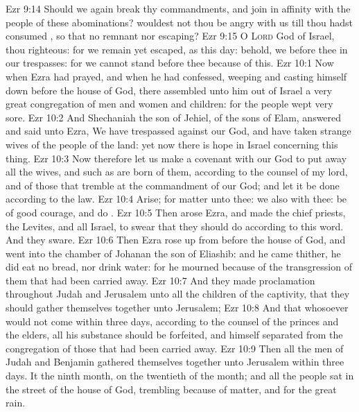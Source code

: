\vs Ezr 9:14 Should we again break thy commandments, and join in affinity with the people of these abominations? wouldest not thou be angry with us till thou hadst consumed , so that  no remnant nor escaping?
\vs Ezr 9:15 O \textsc{Lord} God of Israel, thou  righteous: for we remain yet escaped, as  this day: behold, we  before thee in our trespasses: for we cannot stand before thee because of this.
\vs Ezr 10:1 Now when Ezra had prayed, and when he had confessed, weeping and casting himself down before the house of God, there assembled unto him out of Israel a very great congregation of men and women and children: for the people wept very sore.
\vs Ezr 10:2 And Shechaniah the son of Jehiel,  of the sons of Elam, answered and said unto Ezra, We have trespassed against our God, and have taken strange wives of the people of the land: yet now there is hope in Israel concerning this thing.
\vs Ezr 10:3 Now therefore let us make a covenant with our God to put away all the wives, and such as are born of them, according to the counsel of my lord, and of those that tremble at the commandment of our God; and let it be done according to the law.
\vs Ezr 10:4 Arise; for  matter  unto thee: we also  with thee: be of good courage, and do .
\vs Ezr 10:5 Then arose Ezra, and made the chief priests, the Levites, and all Israel, to swear that they should do according to this word. And they sware.
\vs Ezr 10:6 Then Ezra rose up from before the house of God, and went into the chamber of Johanan the son of Eliashib: and  he came thither, he did eat no bread, nor drink water: for he mourned because of the transgression of them that had been carried away.
\vs Ezr 10:7 And they made proclamation throughout Judah and Jerusalem unto all the children of the captivity, that they should gather themselves together unto Jerusalem;
\vs Ezr 10:8 And that whosoever would not come within three days, according to the counsel of the princes and the elders, all his substance should be forfeited, and himself separated from the congregation of those that had been carried away.
\vs Ezr 10:9 Then all the men of Judah and Benjamin gathered themselves together unto Jerusalem within three days. It  the ninth month, on the twentieth  of the month; and all the people sat in the street of the house of God, trembling because of  matter, and for the great rain.
